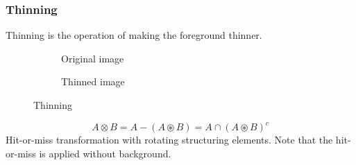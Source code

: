 \subsubsection{Thinning}

Thinning is the operation of making the foreground thinner.
\begin{figure}[h]
	\centering
	\begin{subfigure}[b]{\linewidth}
		\centering
		\caption{Original image}
	\end{subfigure}
	\begin{subfigure}[b]{\linewidth}
		\centering
		\caption{Thinned image}
	\end{subfigure}
	\caption{Thinning}
\end{figure}
\[
	A \otimes  B = A - (A \circledast B) = A \cap (A \circledast B)^c
\]
Hit-or-miss transformation with rotating structuring elements. Note that the hit-or-miss is applied without background.

